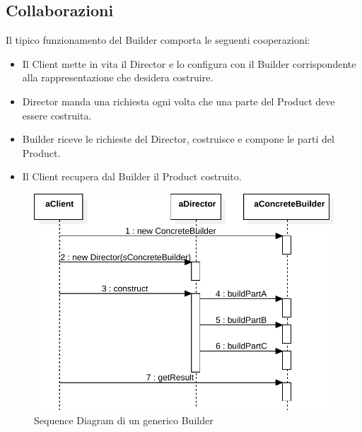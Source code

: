 \subsection{Collaborazioni}
Il tipico funzionamento del Builder comporta le seguenti cooperazioni:
\begin{itemize}
\item Il Client mette in vita il Director e lo configura con il Builder corrispondente alla rappresentazione che desidera costruire.
\item Director manda una richiesta ogni volta che una parte del Product deve essere costruita.
\item Builder riceve le richieste del Director, costruisce e compone le parti del Product.
\item Il Client recupera dal Builder il Product costruito.
\end{itemize}
\begin{figure}[htbp]
\centering
\includegraphics[width=\textwidth,height=\textheight,keepaspectratio]{images/builder-pattern-sequence.pdf}
\caption{Sequence Diagram di un generico Builder}
\label{fig:builder-pattern-sequence}
\end{figure} 


